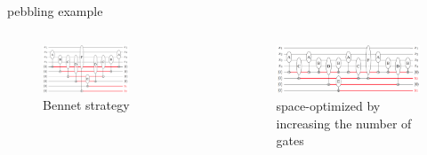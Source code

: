 \begin{frame}{pebbling example}
\begin{columns}
        \begin{minipage}[c][0.4\textheight][c]{\linewidth}
          \begin{figure}[h]  
            \centering
            \includegraphics[width=0.6\textwidth]{figure/a.png}
            \caption{Bennet strategy}
          \end{figure}
      \end{minipage}
        \begin{minipage}[c][0.4\textwidth][c]{\linewidth}
          \begin{figure}[h]
              \centering
              \includegraphics[width=0.8\linewidth]{figure/c.png}
              \caption{space-optimized by increasing the number of gates}
          \end{figure}
        \end{minipage}
    \end{columns}
  \end{frame}